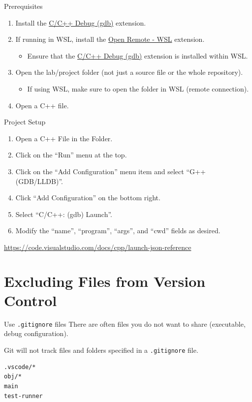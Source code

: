 \documentclass[14pt,aspectratio=1610]{beamer}
\begin{document}
\begin{frame}{Prerequisites}
  \begin{enumerate}
    \item Install the \href{https://open-vsx.org/extension/KylinIdeTeam/cppdebug}{C/C++ Debug (gdb)} extension.

    \item If running in WSL, install the \href{https://open-vsx.org/extension/jeanp413/open-remote-wsl}{Open Remote - WSL} extension.
    
      \begin{itemize}
        \item Ensure that the \href{https://open-vsx.org/extension/KylinIdeTeam/cppdebug}{C/C++ Debug (gdb)} extension is installed within WSL\@.
      \end{itemize}

    \item Open the lab/project folder (not just a source file or the whole repository).
    
      \begin{itemize}
        \item If using WSL, make sure to open the folder in WSL (remote connection).
      \end{itemize}

    \item Open a C++ file.
  \end{enumerate}
\end{frame}

\begin{frame}{Project Setup}
  \begin{enumerate}\setlength\itemsep{0.5em}
    \item Open a C++ File in the Folder.
    \item Click on the ``Run'' menu at the top.
    \item Click on the ``Add Configuration'' menu item and select ``G++ (GDB/LLDB)''.
    \item Click ``Add Configuration'' on the bottom right.
    \item Select ``C/C++: (gdb) Launch''.
    \item Modify the ``name'', ``program'', ``args'', and ``cwd'' fields as desired.
  \end{enumerate}
  {\footnotesize\url{https://code.visualstudio.com/docs/cpp/launch-json-reference}}
\end{frame}

\section*{Excluding Files from Version Control}
\begin{frame}[fragile]{Use \texttt{.gitignore} files}
  There are often files you do not want to share (executable, debug configuration).

  Git will not track files and folders specified in a \texttt{.gitignore} file.
\begin{lstlisting}[language={}]
.vscode/*
obj/*
main
test-runner
\end{lstlisting}
\end{frame}
\end{document}
